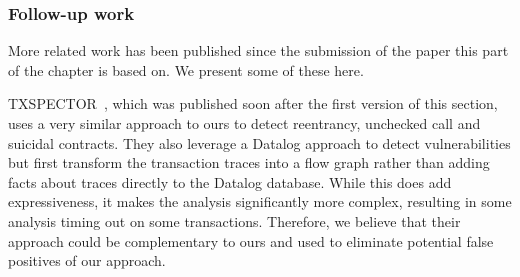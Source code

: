 \subsubsection{Follow-up work}
More related work has been published since the submission of the paper this part of the chapter is based on.
We present some of these here.

TXSPECTOR~\cite{255340}, which was published soon after the first version of this section, uses a very similar approach to ours to detect reentrancy, unchecked call and suicidal contracts.
They also leverage a Datalog approach to detect vulnerabilities but first transform the transaction traces into a flow graph rather than adding facts about traces directly to the Datalog database.
While this does add expressiveness, it makes the analysis significantly more complex, resulting in some analysis timing out on some transactions.
Therefore, we believe that their approach could be complementary to ours and used to eliminate potential false positives of our approach.
